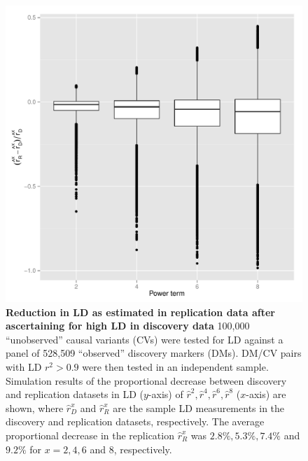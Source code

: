 \documentclass{article}
\begin{document}
\begin{figure}
	\centering
	\includegraphics[width=5in]{ld_reduction}
	\caption{\textbf{Reduction in LD as estimated in replication data after ascertaining for high LD in discovery data} 100,000 ``unobserved'' causal variants (CVs) were tested for LD against a panel of 528,509 ``observed'' discovery markers (DMs). DM/CV pairs with LD $r^2 > 0.9$ were then tested in an independent sample. Simulation results of the proportional decrease between discovery and replication datasets in LD ($y$-axis) of $\hat{r}^2, \hat{r}^4, \hat{r}^6, \hat{r}^8$ ($x$-axis) are shown, where $\hat{r}^{x}_{D}$ and $\hat{r}^{x}_{R}$ are the sample LD measurements in the discovery and replication datasets, respectively. The average proportional decrease in the replication $\hat{r}^{x}_{R}$ was $2.8\%, 5.3\%, 7.4\%$ and $9.2\%$ for $x=2,4,6$ and $8$, respectively.}
	\label{fig:ld_reduction}
\end{figure}
\clearpage
\end{document}

